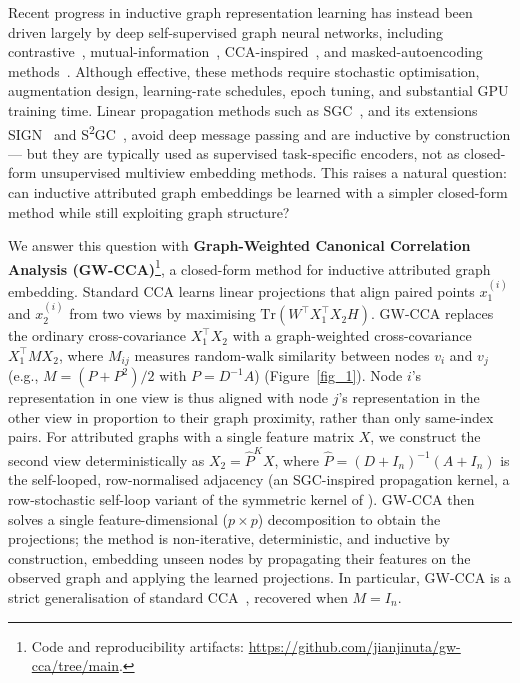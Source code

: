 \documentclass{article}
\begin{document}
Recent progress in inductive graph representation learning has instead
been driven largely by deep self-supervised graph neural networks,
including contrastive~\citep{zhu2020deep,thakoor2022bgrl},
mutual-information~\citep{velickovic2019deep,peng2020graph},
CCA-inspired~\citep{zhang2021ccassg,bielak2022graphbt}, and
masked-autoencoding methods~\citep{hou2023graphmae2}. Although effective,
these methods require stochastic optimisation, augmentation design,
learning-rate schedules, epoch tuning, and substantial GPU training time.
Linear propagation methods such as SGC~\citep{wu2019simplifying}, and its
extensions SIGN~\citep{frasca2020sign} and
S\textsuperscript{2}GC~\citep{zhu2021ssgc}, avoid deep message passing and
are inductive by construction --- but they are typically used as
supervised task-specific encoders, not as closed-form unsupervised
multiview embedding methods. This raises a natural question: can inductive
attributed graph embeddings be learned with a simpler closed-form method
while still exploiting graph structure?

We answer this question with \textbf{Graph-Weighted Canonical Correlation
Analysis (GW-CCA)}\footnote{Code and reproducibility artifacts:
\url{https://github.com/jianjinuta/gw-cca/tree/main}.}, a closed-form
method for inductive attributed graph embedding. Standard CCA learns linear projections that align paired points
$x_1^{(i)}$ and $x_2^{(i)}$ from two views by maximising
$\mathrm{Tr}(W^\top X_1^\top X_2 H)$. GW-CCA replaces the ordinary
cross-covariance $X_1^\top X_2$ with a graph-weighted cross-covariance
$X_1^\top M X_2$, where $M_{ij}$ measures random-walk similarity between
nodes $v_i$ and $v_j$ (e.g., $M = (P + P^2)/2$ with $P = D^{-1}A$)
(Figure~\ref{fig_1}). Node $i$'s representation in one view is thus
aligned with node $j$'s representation in the other view in proportion to
their graph proximity, rather than only same-index pairs. For attributed
graphs with a single feature matrix $X$, we construct the second view
deterministically as $X_2 = \widehat{P}^K X$, where
$\widehat{P} = (D + I_n)^{-1}(A + I_n)$ is the self-looped,
row-normalised adjacency (an SGC-inspired propagation kernel, a
row-stochastic self-loop variant of the symmetric kernel of
\citet{wu2019simplifying}). GW-CCA then solves a single
feature-dimensional ($p \times p$) decomposition to obtain the
projections; the method is non-iterative, deterministic, and inductive by
construction, embedding unseen nodes by propagating their features on the
observed graph and applying the learned projections. In particular, GW-CCA
is a strict generalisation of standard
CCA~\citep{hotelling1992relations}, recovered when $M = I_n$.
\end{document}
